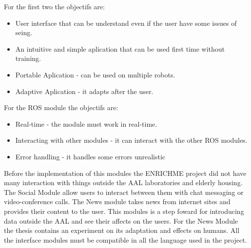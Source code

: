 For the first two the objectifs are:
\begin{itemize}
	\item User interface that can be understand even if the user have some issues of seing.
	\item An intuitive and simple aplication that can be used first time without training.
	\item Portable Aplication - can be used on multiple robots.
	\item Adaptive Aplication - it adapts after the user.
\end{itemize}

For the ROS module the objectifs are:
\begin{itemize}
	\item Real-time - the module must work in real-time.
	\item Interacting with other modules - it can interact with the other ROS modules.
	\item Error handling - it handles some errors unrealistic
\end{itemize}

Before the implementation of this modules the ENRICHME project did not have many interaction with things
outside the AAL laboratories and elderly housing. The Social Module allow 
users to interact between them with chat messaging or video-conference calls. The News module takes news from
internet sites and provides their content to the user. This modules is a step foward for introducing data
outside the AAL and see their affects on the users. For the News Module the thesis contains an experiment
on its adaptation and effects on humans.
All the interface modules must be compatible in all the language used in the project.


